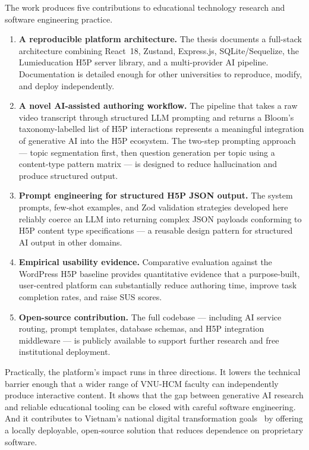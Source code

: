 The work produces five contributions to educational technology research and software engineering practice.

\begin{enumerate}
  \item \textbf{A reproducible platform architecture.} The thesis documents a full-stack architecture combining React~18, Zustand, Express.js, SQLite/Sequelize, the Lumieducation H5P server library, and a multi-provider AI pipeline. Documentation is detailed enough for other universities to reproduce, modify, and deploy independently.
  \item \textbf{A novel AI-assisted authoring workflow.} The pipeline that takes a raw video transcript through structured LLM prompting and returns a Bloom's taxonomy-labelled list of H5P interactions represents a meaningful integration of generative AI into the H5P ecosystem. The two-step prompting approach --- topic segmentation first, then question generation per topic using a content-type pattern matrix --- is designed to reduce hallucination and produce structured output.
  \item \textbf{Prompt engineering for structured H5P JSON output.} The system prompts, few-shot examples, and Zod validation strategies developed here reliably coerce an LLM into returning complex JSON payloads conforming to H5P content type specifications --- a reusable design pattern for structured AI output in other domains.
  \item \textbf{Empirical usability evidence.} Comparative evaluation against the WordPress H5P baseline provides quantitative evidence that a purpose-built, user-centred platform can substantially reduce authoring time, improve task completion rates, and raise SUS scores.
  \item \textbf{Open-source contribution.} The full codebase --- including AI service routing, prompt templates, database schemas, and H5P integration middleware --- is publicly available to support further research and free institutional deployment.
\end{enumerate}

Practically, the platform's impact runs in three directions. It lowers the technical barrier enough that a wider range of VNU-HCM faculty can independently produce interactive content. It shows that the gap between generative AI research and reliable educational tooling can be closed with careful software engineering. And it contributes to Vietnam's national digital transformation goals~\cite{vietnam_strategy2021} by offering a locally deployable, open-source solution that reduces dependence on proprietary software.

